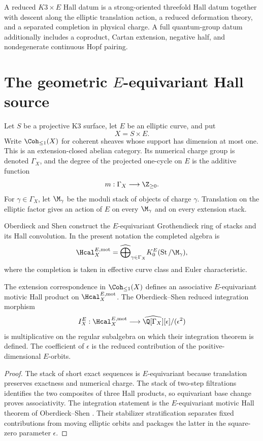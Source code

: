 \begin{definition}
A reduced $K3\times E$ Hall datum is a strong-oriented threefold Hall datum together with descent along the elliptic translation action, a reduced deformation theory, and a separated completion in physical charge.  A full quantum-group datum additionally includes a coproduct, Cartan extension, negative half, and nondegenerate continuous Hopf pairing.
\end{definition}

\chapter{The geometric \texorpdfstring{$E$}{E}-equivariant Hall source}
Let $S$ be a projective K3 surface, let $E$ be an elliptic curve, and put
\[
 X=S\times E.
\]
Write $\Coh_{\leq1}(X)$ for coherent sheaves whose support has dimension at most one.  This is an extension-closed abelian category.  Its numerical charge group is denoted $\Gamma_X$, and the degree of the projected one-cycle on $E$ is the additive function
\[
 m:\Gamma_X\longrightarrow\Z_{\geq0}.
\]
For $\gamma\in\Gamma_X$, let $\M_\gamma$ be the moduli stack of objects of charge $\gamma$.  Translation on the elliptic factor gives an action of $E$ on every $\M_\gamma$ and on every extension stack.

Oberdieck and Shen construct the $E$-equivariant Grothendieck ring of stacks and its Hall convolution.  In the present notation the completed algebra is
\[
 \Hcal_X^{E,\mathrm{mot}}
 =\widehat\bigoplus_{\gamma\in\Gamma_X}
 K_0^E(\operatorname{St}/\M_\gamma),
\]
where the completion is taken in effective curve class and Euler characteristic.

\begin{theorem}
The extension correspondence in $\Coh_{\leq1}(X)$ defines an associative $E$-equivariant motivic Hall product on $\Hcal_X^{E,\mathrm{mot}}$.  The Oberdieck--Shen reduced integration morphism
\[
 I_X^E:\Hcal_X^{E,\mathrm{mot}}
 \longrightarrow
 \widehat{\Q[\Gamma_X]}[\epsilon]/(\epsilon^2)
\]
is multiplicative on the regular subalgebra on which their integration theorem is defined.  The coefficient of $\epsilon$ is the reduced contribution of the positive-dimensional $E$-orbits.
\end{theorem}
\begin{proof}
The stack of short exact sequences is $E$-equivariant because translation preserves exactness and numerical charge.  The stack of two-step filtrations identifies the two composites of three Hall products, so equivariant base change proves associativity.  The integration statement is the $E$-equivariant motivic Hall theorem of Oberdieck--Shen \cite{OberdieckShen}.  Their stabilizer stratification separates fixed contributions from moving elliptic orbits and packages the latter in the square-zero parameter $\epsilon$.
\end{proof}

